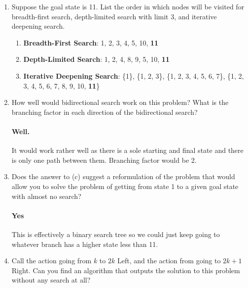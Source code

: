 \documentclass[12pt]{article}
\begin{document}
\begin{enumerate}
\begin{enumerate}
\begin{center}
\end{center}
  \item Suppose the goal state is 11. List the order in which nodes will be visited for breadth-first search, depth-limited search with limit 3, and iterative deepening search.
  \begin{enumerate}
  \item \textbf{Breadth-First Search}: 1, 2, 3, 4, 5, 10, \textbf{11}
  \item \textbf{Depth-Limited Search}: 1, 2, 4, 8, 9, 5, 10, \textbf{11}
  \item \textbf{Iterative Deepening Search}: \{1\}, \{1, 2, 3\}, \{1, 2, 3, 4, 5, 6, 7\}, \{1, 2, 3, 4, 5, 6, 7, 8, 9, 10, \textbf{11}\}
  \end{enumerate}
  \item How well would bidirectional search work on this problem? What is the branching factor in each direction of the bidirectional search?\\
  \vspace{-2.5em}
  \paragraph{Well.} It would work rather well as there is a sole starting and final state and there is only one path between them. Branching factor would be 2.
  \item Does the answer to (c) suggest a reformulation of the problem that would allow you to solve the problem of getting from state 1 to a given goal state with almost no search?\\
  \vspace{-2.5em}
  \paragraph{Yes} This is effectively a binary search tree so we could just keep going to whatever branch has a higher state less than 11.
  \item Call the action going from $k$ to $2k$ Left, and the action from going to $2k + 1$ Right. Can you find an algorithm that outputs the solution to this problem without any search at all?\\
  \vspace{-2.5em}

\end{enumerate}
\end{enumerate}
\end{document}
